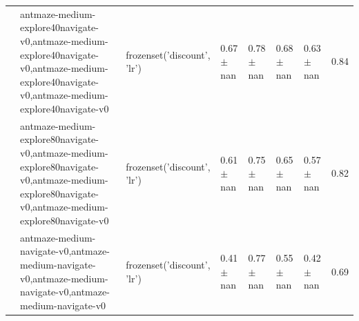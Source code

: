 \begin{tabular}{llllllll}
\cline{2-8}
 & antmaze-medium-explore40navigate-v0,antmaze-medium-explore40navigate-v0,antmaze-medium-explore40navigate-v0,antmaze-medium-explore40navigate-v0 & frozenset({'discount', 'lr'}) & 0.67 $\pm$ nan & 0.78 $\pm$ nan & 0.68 $\pm$ nan & 0.63 $\pm$ nan & 0.84 \\
\cline{2-8}
 & antmaze-medium-explore80navigate-v0,antmaze-medium-explore80navigate-v0,antmaze-medium-explore80navigate-v0,antmaze-medium-explore80navigate-v0 & frozenset({'discount', 'lr'}) & 0.61 $\pm$ nan & 0.75 $\pm$ nan & 0.65 $\pm$ nan & 0.57 $\pm$ nan & 0.82 \\
\cline{2-8}
 & antmaze-medium-navigate-v0,antmaze-medium-navigate-v0,antmaze-medium-navigate-v0,antmaze-medium-navigate-v0 & frozenset({'discount', 'lr'}) & 0.41 $\pm$ nan & 0.77 $\pm$ nan & 0.55 $\pm$ nan & 0.42 $\pm$ nan & 0.69 \\
\cline{1-8} \cline{2-8}
\bottomrule
\end{tabular}
